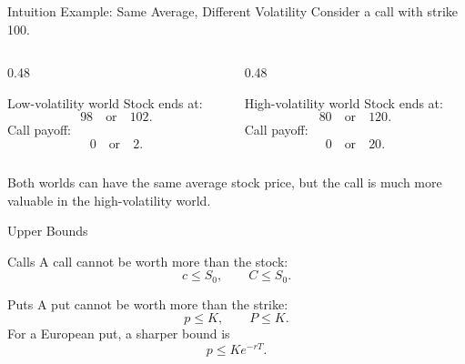 \documentclass[aspectratio=169,11pt]{beamer}
\begin{document}
\begin{frame}{Intuition Example: Same Average, Different Volatility}
    Consider a call with strike 100.

    \begin{columns}[T]
        \begin{column}{0.48\textwidth}
            \begin{block}{Low-volatility world}
                Stock ends at:
                \[
                    98 \quad \text{or} \quad 102.
                \]
                Call payoff:
                \[
                    0 \quad \text{or} \quad 2.
                \]
            \end{block}
        \end{column}
        \begin{column}{0.48\textwidth}
            \begin{block}{High-volatility world}
                Stock ends at:
                \[
                    80 \quad \text{or} \quad 120.
                \]
                Call payoff:
                \[
                    0 \quad \text{or} \quad 20.
                \]
            \end{block}
        \end{column}
    \end{columns}

    \vspace{0.5em}
    Both worlds can have the same average stock price, but the call is much more valuable in the high-volatility world.
\end{frame}

\begin{frame}{Upper Bounds}
    \begin{block}{Calls}
        A call cannot be worth more than the stock:
        \[
            c\leq S_0,
            \qquad
            C\leq S_0.
        \]
    \end{block}

    \begin{block}{Puts}
        A put cannot be worth more than the strike:
        \[
            p\leq K,
            \qquad
            P\leq K.
        \]
        For a European put, a sharper bound is
        \[
            p\leq K e^{-rT}.
        \]
    \end{block}
\end{frame}
\end{document}
